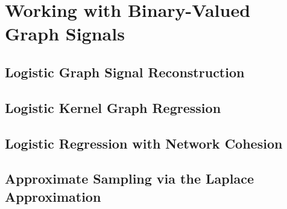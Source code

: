 \chapter{Working with Binary-Valued Graph Signals} %

\label{chap:binary} %



\section{Logistic Graph Signal Reconstruction}

\label{sec:lgsr}


\section{Logistic Kernel Graph Regression}


\label{sec:lkgr}


\section{Logistic Regression with Network Cohesion}

\label{sec:lrnc}


\section{Approximate Sampling via the Laplace Approximation}

\label{sec:lsamp}

